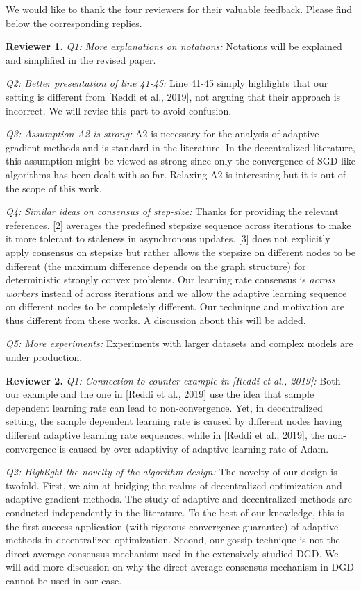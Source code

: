 \documentclass{article}
\begin{document}
We would like to thank the four reviewers for their valuable feedback. Please find below the corresponding replies.

\textbf{Reviewer 1.}
\textit{Q1: More explanations on notations:} 
Notations will be explained and simplified in the revised paper.

\textit{Q2: Better presentation of line 41-45:} Line 41-45 simply highlights that our setting is different from  [Reddi et al., 2019], not arguing that their approach is incorrect. We will revise this part to avoid confusion.

\textit{Q3: Assumption A2 is strong:}
A2 is necessary for the analysis of adaptive gradient methods and is standard in the literature.
In the decentralized literature, this assumption might be viewed as strong since only the convergence of SGD-like algorithms has been dealt with so far.
Relaxing A2 is interesting but it is out of the scope of this work. 

\textit{Q4: Similar ideas on consensus of step-size:}
Thanks for providing the relevant references. 
[2] averages the predefined stepsize sequence across iterations to make it more tolerant to staleness in asynchronous updates.  
[3] does not explicitly apply consensus on stepsize but rather allows the stepsize on different nodes to be different (the maximum difference depends on the graph structure) for deterministic strongly convex problems. 
Our learning rate consensus is \emph{across workers} instead of across iterations and we allow the adaptive learning sequence on different nodes to be completely different. 
Our technique and motivation are thus different from these works. 
A discussion about this will be added.

\textit{Q5: More experiments:}
Experiments with larger datasets and complex models are under production.

\textbf{Reviewer 2.}
\textit{Q1: Connection to counter example in [Reddi et al., 2019]:}
Both our example and the one in [Reddi et al., 2019] use the idea that sample dependent learning rate can lead to non-convergence. 
Yet, in decentralized setting, the sample dependent learning rate is caused by different nodes having different adaptive learning rate sequences, while in [Reddi et al., 2019], the non-convergence is caused by over-adaptivity of adaptive learning rate of Adam. 

\textit{Q2: Highlight the novelty of the algorithm design:}
The novelty of our design is twofold.
First, we aim at bridging the realms of decentralized optimization and adaptive gradient methods. 
The study of adaptive and decentralized methods are conducted independently in the literature. 
To the best of our knowledge, this is the first success application (with rigorous convergence guarantee) of adaptive methods in decentralized optimization. 
Second, our gossip technique is not the direct average consensus mechanism used in the extensively studied DGD.
We will add more discussion on why the direct average consensus mechanism in DGD cannot be used in our case.
\end{document}
